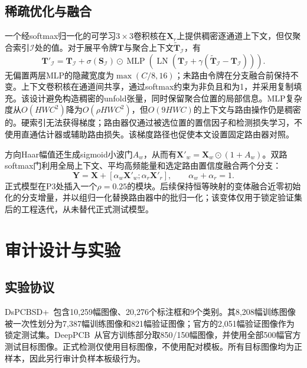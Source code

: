 \documentclass[conference]{IEEEtran}
\begin{document}
\subsection{稀疏优化与融合}
一个经softmax归一化的可学习$3\times3$卷积核在$\mathbf X_r$上提供稠密逐通道上下文，但仅聚合索引$\mathcal I$处的值。对于展平令牌$\mathbf T$与聚合上下文$\tilde{\mathbf T}_{\mathcal I}$，有
\begin{equation}
\mathbf T'_{\mathcal I}=\mathbf T_{\mathcal I}+\sigma(\mathbf S_{\mathcal I})\odot
\operatorname{MLP}\!\left(\operatorname{LN}(\mathbf T_{\mathcal I}+\gamma(\tilde{\mathbf T}_{\mathcal I}-\mathbf T_{\mathcal I}))\right).
\end{equation}
无偏置两层MLP的隐藏宽度为$\max(C/8,16)$；未路由令牌在分支融合前保持不变。上下文卷积核在通道间共享，通过softmax约束为非负且和为1，并采用复制填充。该设计避免构造稠密的unfold张量，同时保留聚合位置的局部信息。MLP复杂度从$O(HWC^2)$降为$O(\rho HWC^2)$，但$O(9HWC)$的上下文与路由操作仍是稠密的。硬索引无法获得梯度；路由器仅通过被选位置的置信因子和检测损失学习，不使用直通估计器或辅助路由损失。该梯度路径也促使本文设置固定路由器对照。

方向Haar幅值还生成sigmoid小波门$A_w$，从而有$\mathbf X'_w=\mathbf X_w\odot(1+A_w)$。双路softmax门利用全局上下文、平均高频能量和选定路由置信度融合两个分支：
\begin{equation}
\mathbf Y=\mathbf X+[\alpha_w\mathbf X'_w;\alpha_r\mathbf X'_r],
\qquad \alpha_w+\alpha_r=1.
\end{equation}
正式模型在P3处插入一个$\rho=0.25$的模块。后续保持恒等映射的变体融合近零初始化的分支增量，并以组归一化替换路由器中的批归一化；该变体仅用于锁定验证集后的工程迭代，从未替代正式测试模型。

\section{审计设计与实验}
\subsection{实验协议}
DsPCBSD+~\cite{dspcbsd}包含10,259幅图像、20,276个标注框和9个类别。其8,208幅训练图像被一次性划分为7,387幅训练图像和821幅验证图像；官方的2,051幅验证图像作为锁定测试集。DeepPCB~\cite{deeppcb}从官方训练部分取850/150幅图像，并使用全部500幅官方测试目标图像。正式检测仅使用目标图像，不使用配对模板。所有目标图像均为正样本，因此另行审计负样本板级行为。
\end{document}
